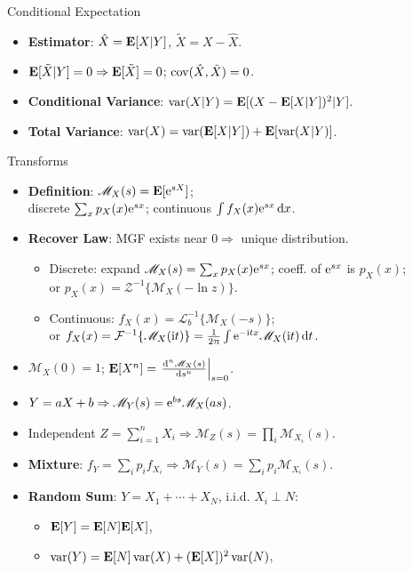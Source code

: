\documentclass[landscape,a4paper]{article}
\begin{document}
\begin{cheatsheetcolumns}
\begin{card}{Conditional Expectation}
\begin{itemize}
\begin{itemize}
				\end{itemize}
				\item \textbf{Estimator}: $\hat X=\mathbf{E}[X|Y]$, $\tilde X=X-\hat X$.
				\item $\mathbf{E}[\tilde X|Y]=0\Rightarrow\mathbf{E}[\tilde X]=0$; $\operatorname{cov}(\hat X,\tilde X)=0$.
				\item \textbf{Conditional Variance}: $\operatorname{var}(X|Y)=\mathbf{E}[(X-\mathbf{E}[X|Y])^2|Y]$.
				\item \textbf{Total Variance}: $\operatorname{var}(X)=\operatorname{var}(\mathbf{E}[X|Y])+\mathbf{E}[\operatorname{var}(X|Y)]$.
			\end{itemize}
		\end{card}
		\begin{card}{Transforms}
			\begin{itemize}
				\item \textbf{Definition}: $\mathscr{M}_X(s)=\mathbf{E}[\mathrm{e}^{sX}]$;\\ discrete $\sum_xp_X(x)\mathrm{e}^{sx}$; continuous $\int f_X(x)\mathrm{e}^{sx}\,\mathrm dx$.
				\item \textbf{Recover Law}: MGF exists near $0\Rightarrow$ unique distribution.
				\begin{itemize}
					\item Discrete: expand $\mathscr{M}_X(s)=\sum_xp_X(x)\mathrm{e}^{sx}$; coeff. of $\mathrm{e}^{sx}$ is $p_X(x)$;\\ or $p_X(x)=\mathcal Z^{-1}\{\mathscr{M}_X(-\ln z)\}$.
					\item Continuous: $f_X(x)=\mathcal L_b^{-1}\{\mathscr{M}_X(-s)\}$;\\ or $f_X(x)=\mathcal F^{-1}\{\mathscr{M}_X(\mathrm{i} t)\}=\frac1{2\uppi}\int\mathrm{e}^{-\mathrm{i} tx}\mathscr{M}_X(\mathrm{i} t)\,\mathrm dt$.
				\end{itemize}
				\item $\mathscr{M}_X(0)=1$; $\EE[X^n]=\left.\odv[n]{\mathscr{M}_X(s)}{s}\right|_{s=0}$.
				\item $Y=aX+b\Rightarrow\mathscr{M}_Y(s)=\mathrm{e}^{bs}\mathscr{M}_X(as)$.
				\item Independent $Z=\sum_{i=1}^nX_i\Rightarrow\mathscr{M}_Z(s)=\prod_i\mathscr{M}_{X_i}(s)$.
				\item \textbf{Mixture}: $f_Y=\sum_ip_if_{X_i}\Rightarrow\mathscr{M}_Y(s)=\sum_ip_i\mathscr{M}_{X_i}(s)$.
				\item \textbf{Random Sum}: $Y=X_1+\cdots+X_N$, i.i.d. $X_i\perp N$:
				\begin{itemize}
					\item $\mathbf{E}[Y]=\mathbf{E}[N]\mathbf{E}[X]$,
					\item $\operatorname{var}(Y)=\mathbf{E}[N]\operatorname{var}(X)+(\mathbf{E}[X])^2\operatorname{var}(N)$,

\end{itemize}
\end{itemize}
\end{card}
\end{cheatsheetcolumns}
\end{document}
